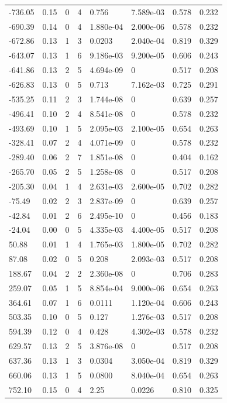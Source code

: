 \documentclass[preview]{standalone}
\begin{document}
{{\begin{tabular}{L{1.2cm}C{1.2cm} C{0.3cm}C{0.5cm} C{1.4cm}C{1.4cm} C{1.4cm}C{1.4cm}}
  -736.05  &  0.15  & 0     &  4 &  0.756  & 7.589e-03  & 0.578 &  0.232   \\ 
  -690.39  &  0.14  & 0     &  4 &  1.880e-04  & 2.000e-06  & 0.578 &  0.232   \\ 
  -672.86  &  0.13  & 1     &  3 &  0.0203  & 2.040e-04  & 0.819 &  0.329   \\ 
  -643.07  &  0.13  & 1     &  6 &  9.186e-03  & 9.200e-05  & 0.606 &  0.243   \\ 
  -641.86  &  0.13  & 2     &  5 &  4.694e-09  & 0  & 0.517 &  0.208   \\ 
  -626.83  &  0.13  & 0     &  5 &  0.713  & 7.162e-03  & 0.725 &  0.291   \\ 
  -535.25  &  0.11  & 2     &  3 &  1.744e-08  & 0  & 0.639 &  0.257   \\ 
  -496.41  &  0.10  & 2     &  4 &  8.541e-08  & 0  & 0.578 &  0.232   \\ 
  -493.69  &  0.10  & 1     &  5 &  2.095e-03  & 2.100e-05  & 0.654 &  0.263   \\ 
  -328.41  &  0.07  & 2     &  4 &  4.071e-09  & 0  & 0.578 &  0.232   \\ 
  -289.40  &  0.06  & 2     &  7 &  1.851e-08  & 0  & 0.404 &  0.162   \\ 
  -265.70  &  0.05  & 2     &  5 &  1.258e-08  & 0  & 0.517 &  0.208   \\ 
  -205.30  &  0.04  & 1     &  4 &  2.631e-03  & 2.600e-05  & 0.702 &  0.282   \\ 
  -75.49  &  0.02  & 2     &  3 &  2.837e-09  & 0  & 0.639 &  0.257   \\ 
  -42.84  &  0.01  & 2     &  6 &  2.495e-10  & 0  & 0.456 &  0.183   \\ 
  -24.04  &  0.00  & 0     &  5 &  4.335e-03  & 4.400e-05  & 0.517 &  0.208   \\ 
  50.88  &  0.01  & 1     &  4 &  1.765e-03  & 1.800e-05  & 0.702 &  0.282   \\ 
  87.08  &  0.02  & 0     &  5 &  0.208  & 2.093e-03  & 0.517 &  0.208   \\ 
  188.67  &  0.04  & 2     &  2 &  2.360e-08  & 0  & 0.706 &  0.283   \\ 
  259.07  &  0.05  & 1     &  5 &  8.854e-04  & 9.000e-06  & 0.654 &  0.263   \\ 
  364.61  &  0.07  & 1     &  6 &  0.0111  & 1.120e-04  & 0.606 &  0.243   \\ 
  503.35  &  0.10  & 0     &  5 &  0.127  & 1.276e-03  & 0.517 &  0.208   \\ 
  594.39  &  0.12  & 0     &  4 &  0.428  & 4.302e-03  & 0.578 &  0.232   \\ 
  629.57  &  0.13  & 2     &  5 &  3.876e-08  & 0  & 0.517 &  0.208   \\ 
  637.36  &  0.13  & 1     &  3 &  0.0304  & 3.050e-04  & 0.819 &  0.329   \\ 
  660.06  &  0.13  & 1     &  5 &  0.0800  & 8.040e-04  & 0.654 &  0.263   \\ 
  752.10  &  0.15  & 0     &  4 &  2.25  & 0.0226  & 0.810 &  0.325   \\ 
\hline 
\end{tabular} 

}}
\end{document}
